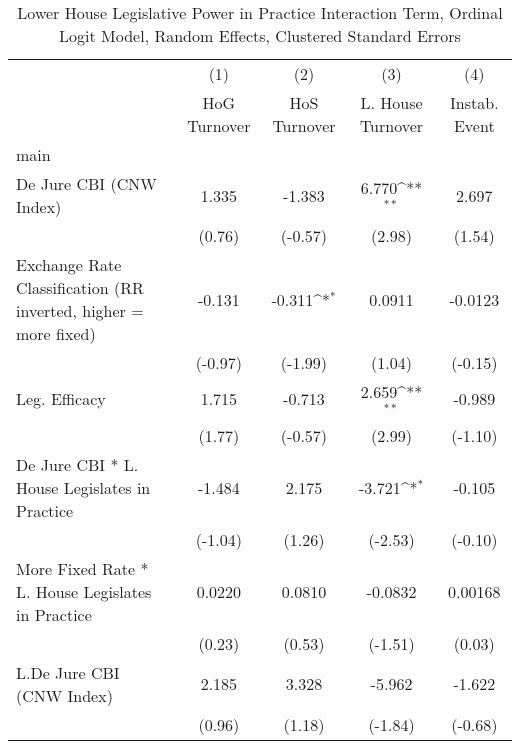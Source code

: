 {
\def\sym#1{\ifmmode^{#1}\else\(^{#1}\)\fi}
\begin{longtable}{l*{4}{c}}
\caption{Lower House Legislative Power in Practice Interaction Term, Ordinal Logit Model, Random Effects, Clustered Standard Errors \label{llpintlagordLogDJ}}\\
\hline\hline\endfirsthead\hline\endhead\hline\endfoot\endlastfoot
                &\multicolumn{1}{c}{(1)}&\multicolumn{1}{c}{(2)}&\multicolumn{1}{c}{(3)}&\multicolumn{1}{c}{(4)}\\
                &\multicolumn{1}{c}{HoG Turnover}&\multicolumn{1}{c}{HoS Turnover}&\multicolumn{1}{c}{L. House Turnover}&\multicolumn{1}{c}{Instab. Event}\\
\hline
main            &                  &                  &                  &                  \\
De Jure CBI (CNW Index)&    1.335         &   -1.383         &    6.770\sym{**} &    2.697         \\
                &   (0.76)         &  (-0.57)         &   (2.98)         &   (1.54)         \\
[1em]
Exchange Rate Classification (RR inverted, higher = more fixed)&   -0.131         &   -0.311\sym{*}  &   0.0911         &  -0.0123         \\
                &  (-0.97)         &  (-1.99)         &   (1.04)         &  (-0.15)         \\
[1em]
Leg. Efficacy   &    1.715         &   -0.713         &    2.659\sym{**} &   -0.989         \\
                &   (1.77)         &  (-0.57)         &   (2.99)         &  (-1.10)         \\
[1em]
De Jure CBI * L. House Legislates in Practice&   -1.484         &    2.175         &   -3.721\sym{*}  &   -0.105         \\
                &  (-1.04)         &   (1.26)         &  (-2.53)         &  (-0.10)         \\
[1em]
More Fixed Rate * L. House Legislates in Practice&   0.0220         &   0.0810         &  -0.0832         &  0.00168         \\
                &   (0.23)         &   (0.53)         &  (-1.51)         &   (0.03)         \\
[1em]
L.De Jure CBI (CNW Index)&    2.185         &    3.328         &   -5.962         &   -1.622         \\
                &   (0.96)         &   (1.18)         &  (-1.84)         &  (-0.68)         \\

\end{longtable}}
